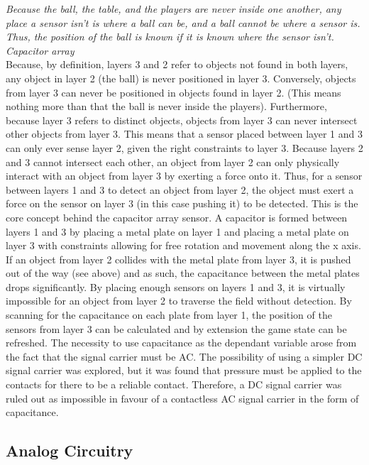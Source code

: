 \documentclass[11pt]{article} %
\begin{document}
\textit{Because the ball, the table, and the players are never inside one another, any place a sensor isn’t is where a ball can be, and a ball cannot be where a sensor is. Thus, the position of the ball is known if it is known where the sensor isn’t. 
Capacitor array} 
\\


Because, by definition, layers 3 and 2 refer to objects not found in both layers, any object in layer 2 (the ball) is never positioned in layer 3. Conversely, objects from layer 3 can never be positioned in objects found in layer 2. (This means nothing more than that the ball is never inside the players). Furthermore, because layer 3 refers to distinct objects, objects from layer 3 can never intersect other objects from layer 3. This means that a sensor placed between layer 1 and 3 can only ever sense layer 2, given the right constraints to layer 3.  Because layers 2 and 3 cannot intersect each other, an object from layer 2 can only physically interact with an object from layer 3 by exerting a force onto it. Thus, for a sensor between layers 1 and 3 to detect an object from layer 2, the object must exert a force on the sensor on layer 3 (in this case pushing it) to be detected.  This is the core concept behind the capacitor array sensor.  A capacitor is formed between layers 1 and 3 by placing a metal plate on layer 1 and placing a metal plate on layer 3 with constraints allowing for free rotation and movement along the x axis. If an object from layer 2 collides with the metal plate from layer 3, it is pushed out of the way (see above) and as such, the capacitance between the metal plates drops significantly. By placing enough sensors 
  on layers 1 and 3, it is virtually impossible for an object from layer 2 to traverse the field without detection. By scanning for the capacitance on each plate from layer 1, the position of the sensors from layer 3 can be calculated and by extension the game state can be refreshed. The necessity to use capacitance as the dependant variable arose from the fact that the signal carrier must be AC. The possibility of using a simpler DC signal carrier was explored, but it was found that pressure must be applied to the contacts for there to be a reliable contact. Therefore, a DC signal carrier was ruled out as impossible in favour of a contactless AC signal carrier in the form of capacitance. 


\subsection{Analog Circuitry}
\end{document}
